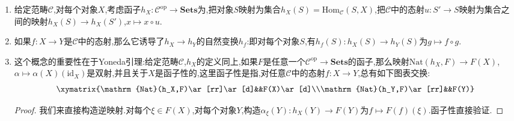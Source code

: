 \begin{enumerate}
	\item 给定范畴$\mathscr{C}$,对每个对象$X$,考虑函子$h_X:\mathscr{C}^{\mathrm{op}}\to\textbf{Sets}$为,把对象$S$映射为集合$h_X(S)=\mathrm{Hom}_{\mathscr{C}}(S,X)$,把$\mathscr{C}$中的态射$u:S'\to S$映射为集合之间的映射$h_X(S)\to h_X(S')$,$x\mapsto x\circ u$.
	\item 如果$f:X\to Y$是$\mathscr{C}$中的态射,那么它诱导了$h_X\to h_Y$的自然变换$h_f$:即对每个对象$S$,有$h_f(S):h_X(S)\to h_Y(S)$为$g\mapsto f\circ g$.
	\item 这个概念的重要性在于Yoneda引理:给定范畴$\mathscr{C}$,$h_X$的定义同上,如果$F$是任意一个$\mathscr{C}^{\mathrm{op}}\to\textbf{Sets}$的函子,那么映射$\mathrm{Nat}(h_X,F)\to F(X)$,$\alpha\mapsto \alpha(X)(\mathrm{id}_X)$是双射,并且关于$X$是函子性的,这里函子性是指,对任意$\mathscr{C}$中的态射$f:X\to Y$,总有如下图表交换:
	$$\xymatrix{\mathrm{Nat}(h_X,F)\ar[rr]\ar[d]&&F(X)\ar[d]\\\mathrm{Nat}(h_Y,F)\ar[rr]&&F(Y)}$$
	\begin{proof}
		
		我们来直接构造逆映射.对每个$\xi\in F(X)$,对每个对象$Y$,构造$\alpha_{\xi}(Y):h_X(Y)\to F(Y)$为$f\mapsto F(f)(\xi)$.函子性直接验证.
	\end{proof}
	
\end{enumerate}


